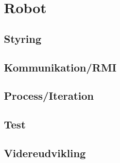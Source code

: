 \chapter{Robot}

\section{Styring}
\section{Kommunikation/RMI}
\section{Process/Iteration}
\section{Test}
\section{Videreudvikling}